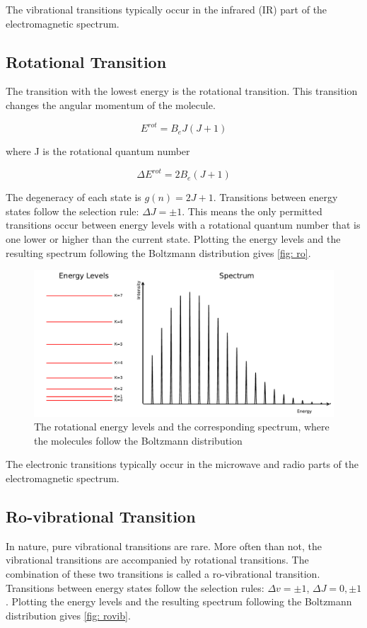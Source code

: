 \documentclass[twoside, single, authoryear, semicolon, 12pt]{lion-msc}
\newcommand{\4}{$_4$}
\newcommand{\3}{$_3$}
\newcommand{\2}{$_2$}
\begin{document}
The vibrational transitions typically occur in the infrared (IR) part of the electromagnetic spectrum. 


\subsection{Rotational Transition}
The transition with the lowest energy is the rotational transition. This transition changes the angular momentum of the molecule. 

\begin{equation}
    E^{rot}=B_eJ(J+1)
\end{equation}

where J is the rotational quantum number

\begin{equation}
    \Delta  E^{rot}=2B_e(J+1)
\end{equation}

The degeneracy of each state is $g(n)=2J+1$. Transitions between energy states follow the selection rule: $\Delta J=\pm 1$. This means the only permitted transitions occur between energy levels with a rotational quantum number that is one lower or higher than the current state. Plotting the energy levels and the resulting spectrum following the Boltzmann distribution gives \autoref{fig: ro}.

\begin{figure}[!ht]
    \centering
    \includegraphics[width=\linewidth]{Figures/RoSpectrum.pdf}
    \caption{The rotational energy levels and the corresponding spectrum, where the molecules follow the Boltzmann distribution}
    \label{fig: ro}
\end{figure}

The electronic transitions typically occur in the microwave and radio parts of the electromagnetic spectrum.

\subsection{Ro-vibrational Transition}
In nature, pure vibrational transitions are rare. More often than not, the vibrational transitions are accompanied by rotational transitions. The combination of these two transitions is called a ro-vibrational transition. Transitions between energy states follow the selection rules: $\Delta v=\pm 1$, $\Delta J=0, \pm 1$. Plotting the energy levels and the resulting spectrum following the Boltzmann distribution gives \autoref{fig: rovib}.
\end{document}
